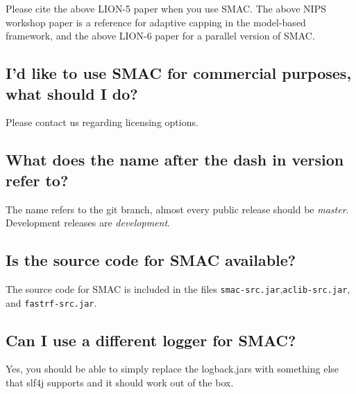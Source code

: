 \documentclass[11pt,letterpaper,oneside]{article}
\begin{document}
Please cite the above LION-5 paper when you use SMAC.
The above NIPS workshop paper is a reference for adaptive capping in the model-based framework, and the above LION-6 paper for a parallel version of SMAC.

\subsection{I'd like to use SMAC for commercial purposes, what should I do?}

Please contact us regarding licensing options.
	
\subsection{What does the name after the dash in version refer to?}

	The name refers to the git branch, almost every public release should be \textit{master}. Development releases are \textit{development}. 

\subsection{Is the source code for SMAC available?}

	The source code for SMAC is included in the files \texttt{smac-src.jar},\texttt{aclib-src.jar}, and \texttt{fastrf-src.jar}.
	
\subsection{Can I use a different logger for SMAC?}

	Yes, you should be able to simply replace the logback.jars with something else that slf4j supports and it should work out of the box. 
\end{document}
